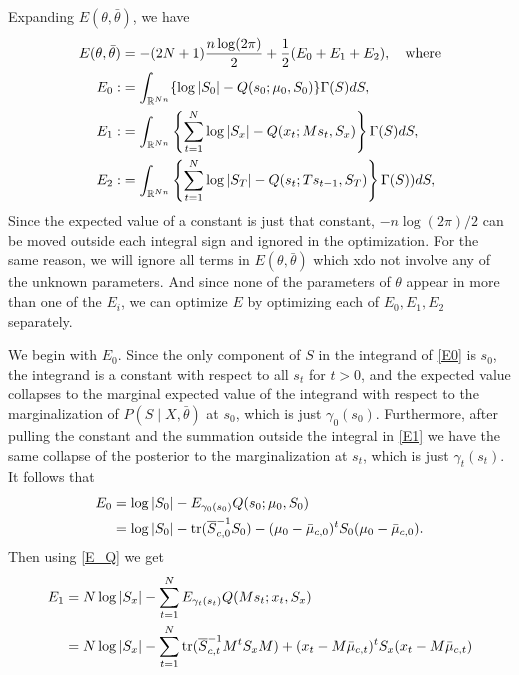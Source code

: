 \documentclass[12pt,leqno]{article}
\begin{document}
Expanding $E(\theta,\bar{\theta})$, we have 
\begin{align}
  E(\theta,\bar{\theta}) &= -(2N+1)\frac{n\log(2\pi)}{2} + \frac{1}{2}(E_0 + E_1 + E_2),\quad\text{where}\notag\\
  E_0 :&=\int_{{\mathbb R}^{Nn}}\{\log|S_0| - Q(s_0;\mu_0,S_0)\}\Gamma(S)dS,\label{E0}\\
  E_1 :&= \int_{{\mathbb R}^{Nn}}\left\{\sum_{t=1}^N\log|S_x| - Q(x_t;Ms_t,S_x)\right\}\Gamma(S)dS,
\label{E1}\\
E_2 :&= \int_{{\mathbb R}^{Nn}}\left\{\sum_{t=1}^N\log|S_T| - Q(s_t;Ts_{t-1},S_T)\right\}\Gamma(S))dS,
\label{E2}
\end{align}
Since the expected value of a constant is just that constant, $-n\log(2\pi)/2$ can be moved outside each
integral sign and ignored in the optimization.  For the same reason, we will ignore all terms in $E(\theta,\bar{\theta})$
which xdo not involve any of the unknown parameters.  And since none of the parameters of $\theta$ appear in more
than one of the $E_i$, we can optimize $E$ by optimizing each of $E_0,E_1,E_2$ separately.

We begin with $E_0$. Since the only component of $S$ in the integrand of \eqref{E0} is $s_0$, the integrand is a constant
with respect to all $s_t$ for $t > 0$, and the expected value
collapses to the marginal 
expected value of the integrand with respect to the marginalization of $P(S\mid X,\bar{\theta})$ at $s_0$, which is just 
$\gamma_0(s_0)$.  Furthermore, after pulling the constant and the summation 
outside the integral in \eqref{E1} we have the same collapse of the posterior to the marginalization at $s_t$,
which is just $\gamma_t(s_t)$.  It follows that
\begin{equation}  \label{E0:1}
  \begin{split}
  E_0 &= \log|S_0| - E_{\gamma_0(s_0)}Q(s_0;\mu_0,S_0)\\
  &=\log|S_0| - \text{\rm tr}(\overline{S}_{c,0}^{-1}S_0) - (\mu_0-\bar{\mu}_{c,0})^tS_0(\mu_0 - \bar{\mu}_{c,0}).
  \end{split}
  \end{equation}
Then using \eqref{E_Q} we get
\begin{equation}\label{E1:1}
  \begin{split}
  E_1 &= N\log|S_x| - \sum_{t=1}^NE_{\gamma_t(s_t)}Q(Ms_t;x_t,S_x)\\
  &= N\log|S_x| - \sum_{t=1}^N\text{\rm tr}(\overline{S}_{c,t}^{-1}M^tS_xM) + (x_t-M\bar{\mu}_{c,t})^tS_x(x_t-M\bar{\mu}_{c,t})
  \end{split}
\end{equation}
\end{document}
